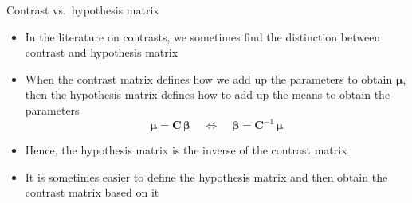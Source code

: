 \documentclass[aspectratio=169]{beamer}
\newcommand{\mat}[1]{\mathbf{#1}}
\newcommand{\gvect}[1]{\boldsymbol{#1}}
\begin{document}
\begin{frame}[<+->]{Contrast vs.\ hypothesis matrix}
  \begin{itemize}
    \item In the literature on contrasts, we sometimes find the distinction
      between contrast and hypothesis matrix \citep[e.\,g.,][]{Schad2020}
    \item When the contrast matrix defines how we add up the parameters to
      obtain $\gvect{\mu}$, then the hypothesis matrix defines how to add up the
      means to obtain the parameters
  \[
    \boldsymbol{\mu} = \mat{C} \, \gvect{\beta} ~~~~~\Leftrightarrow ~~~~~
    \boldsymbol{\beta} = \mat{C}^{-1} \, \gvect{\mu}
  \]
    \item Hence, the hypothesis matrix is the inverse of the contrast matrix
    \item It is sometimes easier to define the hypothesis matrix and then obtain
      the contrast matrix based on it
  \end{itemize}
\end{frame}
\end{document}

